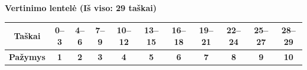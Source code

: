 \documentclass[12pt]{exam}
\begin{document}
\vfill 

\begin{center}
    \textbf{Vertinimo lentelė (Iš viso: 29 taškai)} \\[0.2cm]
    \renewcommand{\arraystretch}{1.3} 
    \begin{tabular}{|c|c|c|c|c|c|c|c|c|c|c|}
        \hline
        \textbf{Taškai} & 0--3 & 4--6 & 7--9 & 10--12 & 13--15 & 16--18 & 19--21 & 22--24 & 25--27 & 28--29 \\ \hline
        \textbf{Pažymys} & \textbf{1} & \textbf{2} & \textbf{3} & \textbf{4} & \textbf{5} & \textbf{6} & \textbf{7} & \textbf{8} & \textbf{9} & \textbf{10} \\ \hline
    \end{tabular}
\end{center}
\end{document}
